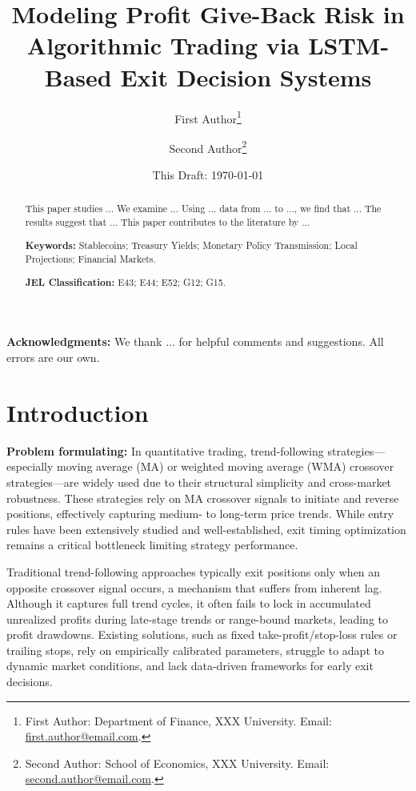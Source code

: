 \documentclass[12pt]{article}
\title{\textbf{Modeling Profit Give-Back Risk in Algorithmic Trading via LSTM-Based Exit Decision Systems}}
\author{
First Author\thanks{
First Author: Department of Finance, XXX University.
Email: \href{mailto:first.author@email.com}{first.author@email.com}.
}
\and
Second Author\thanks{
Second Author: School of Economics, XXX University.
Email: \href{mailto:second.author@email.com}{second.author@email.com}.
}
}
\date{
This Draft: \today
}
\begin{document}
\maketitle

\begin{abstract}
\noindent
This paper studies ...
We examine ...
Using ... data from ... to ..., we find that ...
The results suggest that ...
This paper contributes to the literature by ...

\vspace{0.5em}
\noindent
\textbf{Keywords:} Stablecoins; Treasury Yields; Monetary Policy Transmission; Local Projections; Financial Markets.

\vspace{0.5em}
\noindent
\textbf{JEL Classification:} E43; E44; E52; G12; G15.
\end{abstract}

\vspace{1em}

\noindent
\textbf{Acknowledgments:}
We thank ... for helpful comments and suggestions. All errors are our own.

\newpage

\section{Introduction}\label{sec:introduction}

\textbf{Problem formulating:} In quantitative trading, trend-following strategies—especially moving average (MA) or 
weighted moving average (WMA) crossover strategies—are widely used due to their structural 
simplicity and cross-market robustness. These strategies rely on MA crossover signals to 
initiate and reverse positions, effectively capturing medium- to long-term price trends. 
While entry rules have been extensively studied and well-established, exit timing 
optimization remains a critical bottleneck limiting strategy performance.

Traditional trend-following approaches typically exit positions only when an opposite 
crossover signal occurs, a mechanism that suffers from inherent lag. Although it captures 
full trend cycles, it often fails to lock in accumulated unrealized profits during 
late-stage trends or range-bound markets, leading to profit drawdowns. Existing solutions, 
such as fixed take-profit/stop-loss rules or trailing stops, rely on empirically calibrated 
parameters, struggle to adapt to dynamic market conditions, and lack data-driven frameworks 
for early exit decisions.
\end{document}
